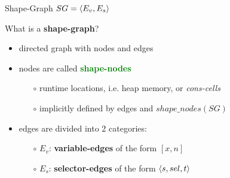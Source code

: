 \documentclass[xcolor={usenames,dvipsnames}]{beamer}
\renewcommand{\emph}[1]{\alert{#1}}
\begin{document}
\begin{frame}[fragile]{Shape-Graph $SG = \langle E_v, E_s \rangle$}

	
	What is a \textbf{shape-graph}?

	\begin{itemize}
	\item directed graph with nodes and edges
	\item nodes are called \textcolor{Green}{\textbf{shape-nodes}}
		\begin{itemize}
		\item[$\circ$] runtime locations, i.e. heap memory, or \textit{cons-cells}
		\item[$\circ$] implicitly defined by edges and $shape\_nodes(SG)$
		\end{itemize}
	\item edges are divided into 2 categories:
		\begin{itemize}
    	\item[$\circ$] \textcolor{VariableEdge}{$E_v$: \textbf{variable-edges}} of the form $ \left[x, n\right] $
    	\item[$\circ$] \textcolor{SelectorEdge}{$E_s$: \textbf{selector-edges}} of the form $ \langle s, sel, t \rangle $
		\end{itemize}
	\end{itemize}

	\begin{center}
  \end{center}


\end{frame}
\end{document}
